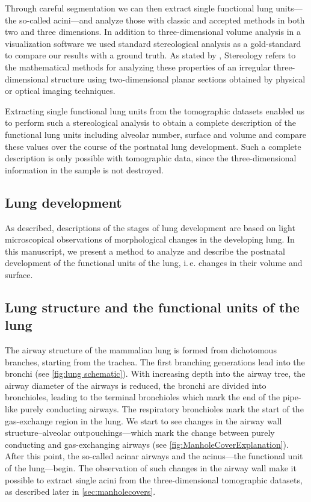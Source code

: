 \documentclass[%
	paper=a4,%
	DIV=calc,%
	twoside=true,%
	abstract=true,%
	]{scrartcl}
\newcommand{\ie}{i.\,e.\xspace}
\newcommand{\todojcs}[2][]{\todo[color=magenta!62!white, #1]{Johannes: #2}}
\begin{document}
Through careful segmentation we can then extract single functional lung units---the so-called acini---and analyze those with classic and accepted methods in both two and three dimensions. In addition to three-dimensional volume analysis in a visualization software we used standard stereological analysis \cite{Hsia2010} as a gold-standard to compare our results with a ground truth. As stated by \citet{Hsia2010}, Stereology refers to the mathematical methods for analyzing these properties of an irregular three-dimensional structure using two-dimensional planar sections obtained by physical or optical imaging techniques.

Extracting single functional lung units from the tomographic datasets enabled us to perform such a stereological analysis to obtain a complete description of the functional lung units including alveolar number, surface and volume and compare these values over the course of the postnatal lung development. Such a complete description is only possible with tomographic data, since the three-dimensional information in the sample is not destroyed.

\subsection{Lung development}
As \citet{Schittny2007a} described, descriptions of the stages of lung development are based on light microscopical observations of morphological changes in the developing lung. In this manuscript, we present a method to analyze and describe the postnatal development of the functional units of the lung, \ie changes in their volume and surface.

\subsection{Lung structure and the functional units of the lung}
The airway structure of the mammalian lung is formed from dichotomous branches\todojcs{Or is this only valid for humans \& not generalized?}, starting from the trachea. The first branching generations lead into the bronchi (see \autoref{fig:lung schematic}). With increasing depth into the airway tree, the airway diameter of the airways is reduced, the bronchi are divided into bronchioles, leading to the terminal bronchioles which mark the end of the pipe-like purely conducting airways. The respiratory bronchioles mark the start of the gas-exchange region in the lung. We start to see changes in the airway wall structure--alveolar outpouchings---which mark the change between purely conducting and gas-exchanging airways (see \autoref{fig:ManholeCoverExplanation}). After this point, the so-called acinar airways and the acinus---the functional unit of the lung---begin. The observation of such changes in the airway wall make it possible to extract single acini from the three-dimensional tomographic datasets, as described later in \autoref{sec:manholecovers}.
\end{document}
